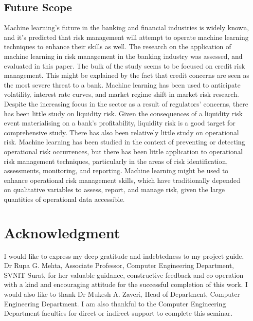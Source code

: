 \documentclass[a4paper, 12pt]{article}
\begin{document}
\subsection{Future Scope}
\noindent Machine learning's future in the banking and financial industries is widely known, and it's predicted that risk management will attempt to operate machine learning techniques to enhance their skills as well. The research on the application of machine learning in risk management in the banking industry was assessed, and evaluated in this paper. The bulk of the study seems to be focused on credit risk management. This might be explained by the fact that credit concerns are seen as the most severe threat to a bank. Machine learning has been used to anticipate volatility, interest rate curves, and market regime shift in market risk research. Despite the increasing focus in the sector as a result of regulators' concerns, there has been little study on liquidity risk. Given the consequences of a liquidity risk event materialising on a bank's profitability, liquidity risk is a good target for comprehensive study. There has also been relatively little study on operational risk. Machine learning has been studied in the context of preventing or detecting operational risk occurrences, but there has been little application to operational risk management techniques, particularly in the areas of risk identification, assessments, monitoring, and reporting. Machine learning might be used to enhance operational risk management skills, which have traditionally depended on qualitative variables to assess, report, and manage risk, given the large quantities of operational data accessible.

\newpage
{}
{}
\printbibliography[heading={References}, title=References]
\newpage
{}
\section*{\centering Acknowledgment}
\vskip 0.2in
\raggedright I would like to express my deep gratitude and indebtedness to my project guide, Dr Rupa G. Mehta, Associate Professor, Computer Engineering Department, SVNIT Surat, for her valuable guidance, constructive feedback and co-operation with a kind and encouraging attitude for the successful completion of this work. I would also like to thank Dr Mukesh A. Zaveri, Head of Department, Computer Engineering Department. I am also thankful to the Computer Engineering Department faculties for direct or indirect support to complete this seminar.
\end{document}
